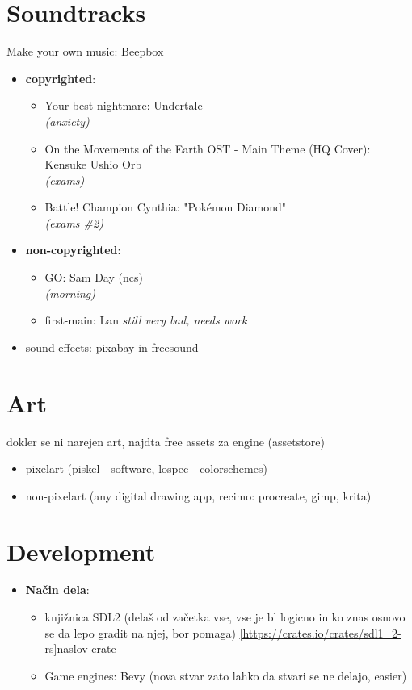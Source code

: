 \documentclass[a4paper]{article}
\begin{document}
\section{Soundtracks}
Make your own music: Beepbox
\begin{itemize}
    \item \textbf{copyrighted}: \begin{itemize}
        \item Your best nightmare: Undertale \\
        \textsl{(anxiety)}
        \item On the Movements of the Earth OST - Main Theme (HQ Cover): Kensuke Ushio Orb \\
        \textsl{(exams)}
        \item Battle! Champion Cynthia: "Pokémon Diamond"\\
        \textsl{(exams \#2)}
    \end{itemize}
    
    \item \textbf{non-copyrighted}: \begin{itemize}
        \item GO: Sam Day (ncs) \\
        \textsl{(morning)}
        \item first-main: Lan
        \textsl{still very bad, needs work}
    \end{itemize}
    \item sound effects: pixabay in freesound
\end{itemize}

\section{Art}
dokler se ni narejen art, najdta free assets za engine (assetstore)
\begin{itemize}
    \item pixelart (piskel - software, lospec - colorschemes)
    \item non-pixelart (any digital drawing app, recimo: procreate, gimp, krita)
\end{itemize}

\section{Development}
\begin{itemize}
    \item \textbf{Način dela}: \begin{itemize}
        \item knjižnica SDL2 (delaš od začetka vse, vse je bl logicno in ko znas osnovo se da lepo gradit na njej, bor pomaga) \ref{https://crates.io/crates/sdl1_2-rs}{naslov crate}
        \item Game engines: Bevy (nova stvar zato lahko da stvari se ne delajo, easier)
    \end{itemize}
\end{itemize}
\end{document}
